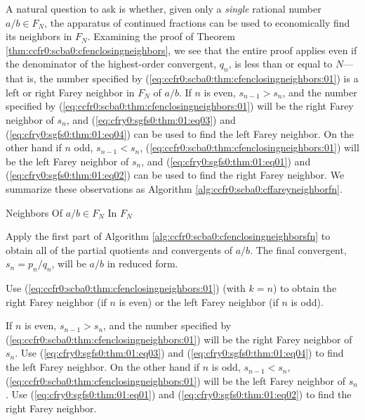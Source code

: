 A natural question to ask is whether, given only a \emph{single}
rational number $a/b \in F_N$, the apparatus of continued fractions
can be used to economically find its neighbors in $F_N$.  Examining
the proof of Theorem \ref{thm:ccfr0:scba0:cfenclosingneighbors},
we see that the entire proof applies even if the denominator of the 
highest-order convergent, $q_n$, is less than or equal to $N$---that is,
the number specified by (\ref{eq:ccfr0:scba0:thm:cfenclosingneighbors:01})
is a left or right Farey neighbor in $F_N$ of $a/b$.  If $n$ is even,
$s_{n-1} > s_n$, and the number specified by 
(\ref{eq:ccfr0:scba0:thm:cfenclosingneighbors:01}) will be the right Farey neighbor
of $s_n$, and 
(\ref{eq:cfry0:sgfs0:thm:01:eq03}) and 
(\ref{eq:cfry0:sgfs0:thm:01:eq04}) 
can be used to find the left Farey neighbor.
On the other hand if $n$ odd, $s_{n-1} < s_n$, (\ref{eq:ccfr0:scba0:thm:cfenclosingneighbors:01})
will be the left Farey neighbor of $s_n$, and 
(\ref{eq:cfry0:sgfs0:thm:01:eq01}) 
and 
(\ref{eq:cfry0:sgfs0:thm:01:eq02}) 
can be used to find the
right Farey neighbor.  We summarize these observations as Algorithm
\ref{alg:ccfr0:scba0:cffareyneighborfn}.

\begin{vworkalgorithmstatementpar}{Neighbors Of 
                                   \mbox{\boldmath $a/b \in F_N$} 
                                   In \mbox{\boldmath $F_N$}}
\label{alg:ccfr0:scba0:cffareyneighborfn}
\end{vworkalgorithmstatementpar}
\begin{alglvl0}

\item  Apply the first part of Algorithm 
       \ref{alg:ccfr0:scba0:cfenclosingneighborsfn} to obtain
	   all of the partial quotients and convergents of $a/b$.
	   The final convergent, $s_n = p_n/q_n$, will be 
	   $a/b$ in reduced form.

\item  Use (\ref{eq:ccfr0:scba0:thm:cfenclosingneighbors:01})
       (with $k = n$) to obtain the right Farey neighbor
	   (if $n$ is even) or the left Farey neighbor (if $n$
	   is odd).

\item  If $n$ is even, $s_{n-1} > s_n$, and the number specified by 
       (\ref{eq:ccfr0:scba0:thm:cfenclosingneighbors:01}) will be 
	   the right Farey neighbor of $s_n$.  Use 
       (\ref{eq:cfry0:sgfs0:thm:01:eq03}) and 
       (\ref{eq:cfry0:sgfs0:thm:01:eq04}) 
       to find the left Farey neighbor.
       On the other hand if $n$ is odd, $s_{n-1} < s_n$, 
	   (\ref{eq:ccfr0:scba0:thm:cfenclosingneighbors:01})
       will be the left Farey neighbor of $s_n$.  Use
       (\ref{eq:cfry0:sgfs0:thm:01:eq01}) 
       and (\ref{eq:cfry0:sgfs0:thm:01:eq02}) 
       to find the right Farey neighbor.

\end{alglvl0}

